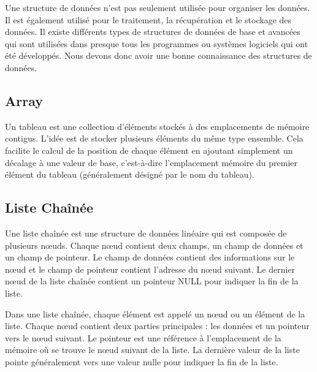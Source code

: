 \documentclass{article}
\begin{document}
        Une structure de données n'est pas seulement utilisée pour organiser les données. Il est également utilisé pour le traitement, la récupération et le stockage des données. Il existe différents types de structures de données de base et avancées qui sont utilisées dans presque tous les programmes ou systèmes logiciels qui ont été développés. Nous devons donc avoir une bonne connaissance des structures de données.

        \subsection{Array}

            \begin{bclogo}[logo=\bcinfo, noborder=true, couleur=white]{}

                Un tableau est une collection d'éléments stockés à des emplacements de mémoire contigus. L'idée est de stocker plusieurs éléments du même type ensemble. Cela facilite le calcul de la position de chaque élément en ajoutant simplement un décalage à une valeur de base, c'est-à-dire l'emplacement mémoire du premier élément du tableau (généralement désigné par le nom du tableau).
            
            \end{bclogo}


        
        \subsection{Liste Chaînée}
            
            \begin{bclogo}[logo=\bcinfo, noborder=true, couleur=white]{}

                Une liste chaînée est une structure de données linéaire qui est composée de plusieurs nœuds. Chaque nœud contient deux champs, un champ de données et un champ de pointeur. Le champ de données contient des informations sur le nœud et le champ de pointeur contient l'adresse du nœud suivant. Le dernier nœud de la liste chaînée contient un pointeur NULL pour indiquer la fin de la liste.
            
            \end{bclogo}

            Dans une liste chaînée, chaque élément est appelé un nœud ou un élément de la liste. Chaque nœud contient deux parties principales : les données et un pointeur vers le nœud suivant. Le pointeur est une référence à l'emplacement de la mémoire où se trouve le nœud suivant de la liste. La dernière valeur de la liste pointe généralement vers une valeur nulle pour indiquer la fin de la liste.
\end{document}
